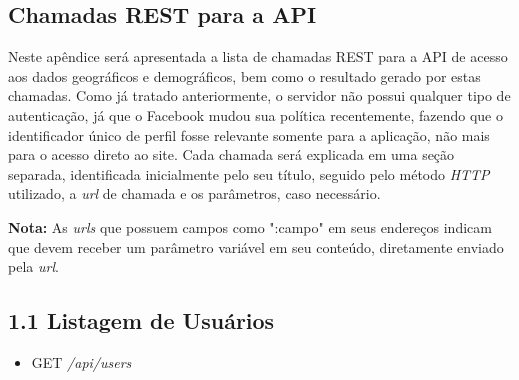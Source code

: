 \documentclass[
	12pt,				%
	oneside,			%
	a4paper,			%
	english,			%
	brazil				%
	]{abntex2ppgsi}
\begin{document}
\begin{apendicesenv}


%
%
%
\chapter{Chamadas REST para a API}
\label{apendiceA}

Neste apêndice será apresentada a lista de chamadas REST para a API de acesso aos dados geográficos e demográficos, bem como o resultado gerado por estas chamadas. Como já tratado anteriormente, o servidor não possui qualquer tipo de autenticação, já que o Facebook mudou sua política recentemente, fazendo que o identificador único de perfil fosse relevante somente para a aplicação, não mais para o acesso direto ao site. Cada chamada será explicada em uma seção separada, identificada inicialmente pelo seu título, seguido pelo método \textit{HTTP} utilizado, a \textit{url} de chamada e os parâmetros, caso necessário.

\textbf{Nota: } As \textit{urls} que possuem campos como ":campo" em seus endereços indicam que devem receber um parâmetro variável em seu conteúdo, diretamente enviado pela \textit{url}.

\section*{1.1 Listagem de Usuários}

\begin{itemize}
	\item {GET} \textit{/api/users}
\end{itemize}


\end{apendicesenv}
\end{document}
